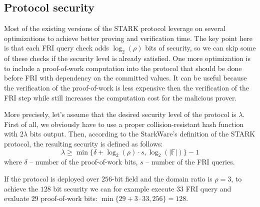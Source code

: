 \documentclass[../lecture-notes.tex]{subfiles}
\begin{document}
\subsection{Protocol security}
Most of the existing versions of the STARK protocol leverage on several
optimizations to achieve better proving and verification time. The key point
here is that each FRI query check adds $\log_2(\rho)$ bits of security, so we can
skip some of these checks if the security level is already satisfied. One more
optimization is to include a proof-of-work computation into the protocol that
should be done before FRI with dependency on the committed values. It can be
useful because the verification of the proof-of-work is less expensive then the
verification of the FRI step while still increases the computation cost for the
malicious prover. 

More precisely, let's assume that the desired security level of the protocol is
$\lambda$. First of all, we obviously have to use a proper collision-resistant
hash function with $2\lambda$ bits output. Then, according to the StarkWare's
definition of the STARK protocol, the resulting security is defined as follows:
\begin{equation*}
    \lambda \geq \min\{ \delta + \log_2(\rho) \cdot s, \log_2(|\mathbb{F}|) \} - 1
\end{equation*}
where $\delta$ -- number of the proof-of-work bits, $s$ -- number of the FRI queries.

\begin{example}
If the protocol is deployed over $256$-bit field and the domain ratio is $\rho =
3$, to achieve the $128$ bit security we can for example execute $33$ FRI query
and evaluate $29$ proof-of-work bits: $\min\{29+3\cdot 33, 256\} = 128$. 
\end{example}
\end{document}

